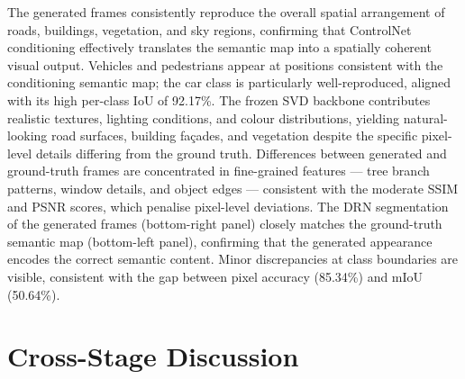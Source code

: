 The generated frames consistently reproduce the overall spatial arrangement of roads, buildings, vegetation, and sky regions, confirming that ControlNet conditioning effectively translates the semantic map into a spatially coherent visual output. Vehicles and pedestrians appear at positions consistent with the conditioning semantic map; the car class is particularly well-reproduced, aligned with its high per-class IoU of 92.17\%. The frozen SVD backbone contributes realistic textures, lighting conditions, and colour distributions, yielding natural-looking road surfaces, building façades, and vegetation despite the specific pixel-level details differing from the ground truth. Differences between generated and ground-truth frames are concentrated in fine-grained features — tree branch patterns, window details, and object edges — consistent with the moderate SSIM and PSNR scores, which penalise pixel-level deviations. The DRN segmentation of the generated frames (bottom-right panel) closely matches the ground-truth semantic map (bottom-left panel), confirming that the generated appearance encodes the correct semantic content. Minor discrepancies at class boundaries are visible, consistent with the gap between pixel accuracy (85.34\%) and mIoU (50.64\%).

\FloatBarrier
\section{Cross-Stage Discussion}
\label{sec:cross_stage}

